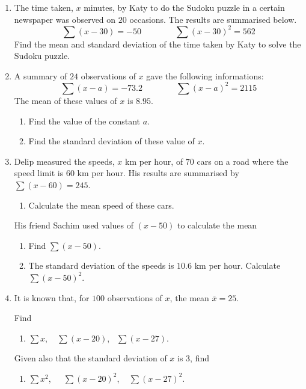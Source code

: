 \begin{enumerate}
\item The time taken, $x$ minutes, by Katy  to do the Sudoku puzzle in a certain newspaper was observed on $20$ occasions. The results are summarised below.
\[
\sum (x-30) = -50   \qquad \qquad \sum (x-30)^2 =562
\]
Find the mean and standard deviation of the time taken by Katy to solve the Sudoku puzzle.




\item  A summary of $24$ observations of $x$ gave the following informations:
\[
\sum (x-a) = -73.2   \qquad \qquad \sum (x-a)^2 =2115
\]
The mean of these values of $x$ is $8.95$.
\begin{enumerate}
	\item Find the value of the constant $a$.
	\item Find the standard deviation of these value of $x$.
\end{enumerate}



\item  Delip measured the speeds, $x$ \si{\km} per hour, of  $70$ cars on a road where the speed limit is $60$ \si{\km} per hour. His results are summarised by  $\displaystyle \sum (x-60) = 245$.

\begin{enumerate}
	\item Calculate the mean speed of these cars.
\end{enumerate}

His friend Sachim used values of $(x-50)$ to calculate the mean

\begin{enumerate}[resume]
	\item  Find $\displaystyle \sum (x-50)$.
	\item The standard deviation of the speeds is $10.6$ \si{\km} per hour. Calculate  $\displaystyle \sum (x-50)^2$.
\end{enumerate}


\item It is known that, for $100$ observations of $x$, the mean $\bar{x} = 25$.

Find 
\begin{enumerate}
	\item $\displaystyle \sum x$, \,\,\, $\displaystyle \sum (x-20)$,  \,\,\,$\displaystyle \sum (x-27)$.
\end{enumerate} 

Given also that the standard deviation of $x$ is $3$, find 

\begin{enumerate}[resume]
	\item $\displaystyle \sum x^2$,  \,\, \, $\displaystyle \sum (x-20)^2$,  \, \,\,$\displaystyle \sum (x-27)^2$.
\end{enumerate}





\end{enumerate}

